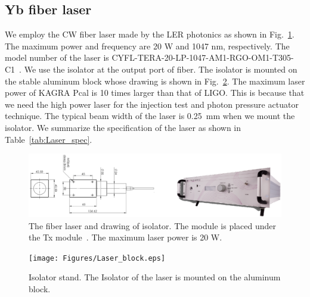 \subsection{Yb fiber laser}
We employ the CW fiber laser made by the LER photonics as shown in Fig.~\ref{fig:Laser}. The maximum power and frequency are 20 W and 1047 nm, respectively. The model number of the laser is CYFL-TERA-20-LP-1047-AM1-RGO-OM1-T305-C1~\cite{Keopsys}. We use the isolator at the output port of fiber. The isolator is mounted on the stable aluminum block whose drawing is shown in Fig.~\ref{fig:Laser_block}. The maximum laser power of KAGRA Pcal is 10 times larger than that of LIGO. This is because that we need the high power laser for the injection test and photon pressure actuator technique. The typical beam width of the laser is 0.25~mm when we mount the isolator. We summarize the specification of the laser as shown in Table~\ref{tab:Laser_spec}.

\begin{figure}
\begin{center}
\includegraphics[width=14cm]{Figures/Laser.eps}
\caption{The fiber laser and drawing of isolator. The module is placed under the Tx module~\cite{Keopsys}. The maximum laser power is 20 W.} 
\label{fig:Laser} 
\end{center}
\end{figure}

\begin{figure}
\begin{center}
\texttt{[image: Figures/Laser\_block.eps]}
\caption{Isolator stand. The Isolator of the laser is mounted on the aluminum block.} 
\label{fig:Laser_block} 
\end{center}
\end{figure}

